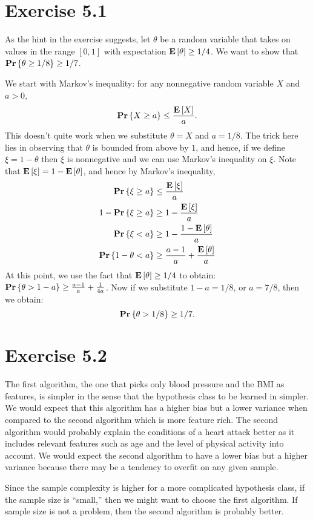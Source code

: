 \section*{Exercise 5.1}

As the hint in the exercise suggests, let $\theta$ be a random variable that takes
on values in the range $[0, 1]$ with expectation $\mathbf{E} \left [ \theta \right ] \geq 1 / 4$. We
want to show that $\mathbf{Pr} \left \{ \theta \geq 1 / 8 \right \} \geq 1 / 7$.

We start with Markov's inequality: for any nonnegative random variable $X$ and $a > 0$,
\[
    \mathbf{Pr} \left \{ X \geq a \right \} \leq \frac{\mathbf{E} \left [ X \right ]}{a}.
\]
This doesn't quite work when we substitute $\theta = X$ and $a = 1 / 8$. The
trick here lies in observing that $\theta$ is bounded from above by $1$, and
hence, if we define $\xi = 1 - \theta$ then $\xi$ is nonnegative and we can use
Markov's inequality on $\xi$. Note that $\mathbf{E} \left [ \xi \right ] =  1 - \mathbf{E} \left [ \theta \right ]$,
and hence by Markov's inequality,
\begin{align*}
    \mathbf{Pr} \left \{ \xi \geq a \right \} & \leq \frac{\mathbf{E} \left [ \xi \right ]}{a} \\
    1 -  \mathbf{Pr} \left \{ \xi \geq a \right \} & \geq 1 - \frac{\mathbf{E} \left [ \xi \right ]}{a} \\
    \mathbf{Pr} \left \{ \xi < a \right \} & \geq 1 - \frac{1 - \mathbf{E} \left [ \theta \right ]}{a} \\
    \mathbf{Pr} \left \{ 1 - \theta < a \right \} & \geq \frac{a - 1}{a} + \frac{\mathbf{E} \left [ \theta \right ]}{a}
\end{align*}
At this point, we use the fact that $\mathbf{E} \left [ \theta \right ] \geq 1 / 4$ to obtain:
$\mathbf{Pr} \left \{ \theta > 1 - a \right \} \geq \frac{a - 1}{a} + \frac{1}{4a}$. Now if we substitute
$1 - a =  1 / 8$, or $a = 7 / 8$, then we obtain:
\[
    \mathbf{Pr} \left \{ \theta > 1 / 8 \right \} \geq 1 / 7.
\]

\section*{Exercise 5.2}

The first algorithm, the one that picks only blood pressure and the BMI as
features, is simpler in the sense that the hypothesis class to be learned in
simpler. We would expect that this algorithm has a higher bias but a lower
variance when compared to the second algorithm which is more feature rich. The second
algorithm would probably explain the conditions of a heart attack better as it
includes relevant features such as age and the level of physical activity into
account. We would expect the second algorithm to have a lower bias but a higher
variance because there may be a tendency to overfit on any given sample.

Since the sample complexity is higher for a more complicated hypothesis class,
if the sample size is ``small,'' then we might want to choose the first algorithm.
If sample size is not a problem, then the second algorithm is probably better.
